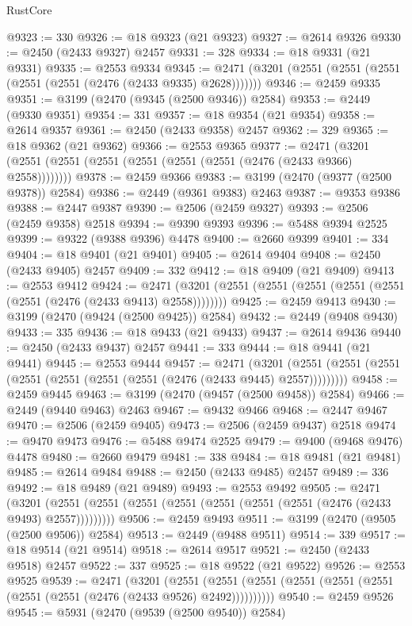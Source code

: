 \begin{lexlean}{RustCore}
\begin{coremodule}
@9323 := 330
@9326 := @18 @9323 (@21 @9323)
@9327 := @2614 @9326
@9330 := @2450 (@2433 @9327) @2457
@9331 := 328
@9334 := @18 @9331 (@21 @9331)
@9335 := @2553 @9334
@9345 := @2471 (@3201 (@2551 (@2551 (@2551 (@2551 (@2551 (@2476 (@2433 @9335) @2628)))))))
@9346 := @2459 @9335
@9351 := @3199 (@2470 (@9345 (@2500 @9346)) @2584)
@9353 := @2449 (@9330 @9351)
@9354 := 331
@9357 := @18 @9354 (@21 @9354)
@9358 := @2614 @9357
@9361 := @2450 (@2433 @9358) @2457
@9362 := 329
@9365 := @18 @9362 (@21 @9362)
@9366 := @2553 @9365
@9377 := @2471 (@3201 (@2551 (@2551 (@2551 (@2551 (@2551 (@2551 (@2476 (@2433 @9366) @2558))))))))
@9378 := @2459 @9366
@9383 := @3199 (@2470 (@9377 (@2500 @9378)) @2584)
@9386 := @2449 (@9361 @9383) @2463
@9387 := @9353 @9386
@9388 := @2447 @9387
@9390 := @2506 (@2459 @9327)
@9393 := @2506 (@2459 @9358) @2518
@9394 := @9390 @9393
@9396 := @5488 @9394 @2525
@9399 := @9322 (@9388 @9396) @4478
@9400 := @2660 @9399
@9401 := 334
@9404 := @18 @9401 (@21 @9401)
@9405 := @2614 @9404
@9408 := @2450 (@2433 @9405) @2457
@9409 := 332
@9412 := @18 @9409 (@21 @9409)
@9413 := @2553 @9412
@9424 := @2471 (@3201 (@2551 (@2551 (@2551 (@2551 (@2551 (@2551 (@2476 (@2433 @9413) @2558))))))))
@9425 := @2459 @9413
@9430 := @3199 (@2470 (@9424 (@2500 @9425)) @2584)
@9432 := @2449 (@9408 @9430)
@9433 := 335
@9436 := @18 @9433 (@21 @9433)
@9437 := @2614 @9436
@9440 := @2450 (@2433 @9437) @2457
@9441 := 333
@9444 := @18 @9441 (@21 @9441)
@9445 := @2553 @9444
@9457 := @2471
    (@3201 (@2551 (@2551 (@2551 (@2551 (@2551 (@2551 (@2551 (@2476 (@2433 @9445) @2557)))))))))
@9458 := @2459 @9445
@9463 := @3199 (@2470 (@9457 (@2500 @9458)) @2584)
@9466 := @2449 (@9440 @9463) @2463
@9467 := @9432 @9466
@9468 := @2447 @9467
@9470 := @2506 (@2459 @9405)
@9473 := @2506 (@2459 @9437) @2518
@9474 := @9470 @9473
@9476 := @5488 @9474 @2525
@9479 := @9400 (@9468 @9476) @4478
@9480 := @2660 @9479
@9481 := 338
@9484 := @18 @9481 (@21 @9481)
@9485 := @2614 @9484
@9488 := @2450 (@2433 @9485) @2457
@9489 := 336
@9492 := @18 @9489 (@21 @9489)
@9493 := @2553 @9492
@9505 := @2471
    (@3201 (@2551 (@2551 (@2551 (@2551 (@2551 (@2551 (@2551 (@2476 (@2433 @9493) @2557)))))))))
@9506 := @2459 @9493
@9511 := @3199 (@2470 (@9505 (@2500 @9506)) @2584)
@9513 := @2449 (@9488 @9511)
@9514 := 339
@9517 := @18 @9514 (@21 @9514)
@9518 := @2614 @9517
@9521 := @2450 (@2433 @9518) @2457
@9522 := 337
@9525 := @18 @9522 (@21 @9522)
@9526 := @2553 @9525
@9539 := @2471
    (@3201
      (@2551 (@2551 (@2551 (@2551 (@2551 (@2551 (@2551 (@2551 (@2476 (@2433 @9526) @2492))))))))))
@9540 := @2459 @9526
@9545 := @5931 (@2470 (@9539 (@2500 @9540)) @2584)

\end{coremodule}
\end{lexlean}
